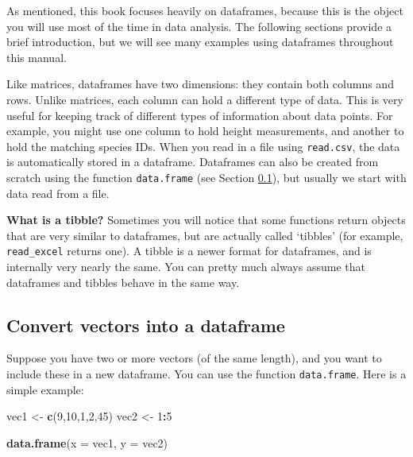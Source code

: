 \documentclass[]{book}
\newenvironment{Shaded}{\begin{snugshade}}{\end{snugshade}}
\newcommand{\DataTypeTok}[1]{\textcolor[rgb]{0.13,0.29,0.53}{#1}}
\newcommand{\DecValTok}[1]{\textcolor[rgb]{0.00,0.00,0.81}{#1}}
\newcommand{\KeywordTok}[1]{\textcolor[rgb]{0.13,0.29,0.53}{\textbf{#1}}}
\newcommand{\NormalTok}[1]{#1}
\newcommand{\OperatorTok}[1]{\textcolor[rgb]{0.81,0.36,0.00}{\textbf{#1}}}
\newcommand{\StringTok}[1]{\textcolor[rgb]{0.31,0.60,0.02}{#1}}
\let\BeginKnitrBlock\begin \let\EndKnitrBlock\end
\begin{document}
As mentioned, this book focuses heavily on dataframes, because this is the object you will use most of the time in data analysis. The following sections provide a brief introduction, but we will see many examples using dataframes throughout this manual.

Like matrices, dataframes have two dimensions: they contain both columns and rows. Unlike matrices, each column can hold a different type of data. This is very useful for keeping track of different types of information about data points. For example, you might use one column to hold height measurements, and another to hold the matching species IDs. When you read in a file using \texttt{read.csv}, the data is automatically stored in a dataframe. Dataframes can also be created from scratch using the function \texttt{data.frame} (see Section \ref{vecstodfr}), but usually we start with data read from a file.

\BeginKnitrBlock{rmdinfo}
\textbf{What is a tibble?}
Sometimes you will notice that some functions return objects that are very similar to
dataframes, but are actually called `tibbles' (for example, \texttt{read\_excel} returns one). A tibble is a newer format for dataframes, and is internally very nearly the same. You can pretty much always assume that dataframes and tibbles behave in the same way.
\EndKnitrBlock{rmdinfo}

\hypertarget{vecstodfr}{%
\subsection{Convert vectors into a dataframe}\label{vecstodfr}}

Suppose you have two or more vectors (of the same length), and you want to include these in a new dataframe. You can use the function \texttt{data.frame}. Here is a simple example:

\begin{Shaded}
\begin{Highlighting}[]
\NormalTok{vec1 <-}\StringTok{ }\KeywordTok{c}\NormalTok{(}\DecValTok{9}\NormalTok{,}\DecValTok{10}\NormalTok{,}\DecValTok{1}\NormalTok{,}\DecValTok{2}\NormalTok{,}\DecValTok{45}\NormalTok{)}
\NormalTok{vec2 <-}\StringTok{ }\DecValTok{1}\OperatorTok{:}\DecValTok{5}

\KeywordTok{data.frame}\NormalTok{(}\DataTypeTok{x =}\NormalTok{ vec1, }\DataTypeTok{y =}\NormalTok{ vec2)}
\end{Highlighting}
\end{Shaded}
\end{document}
